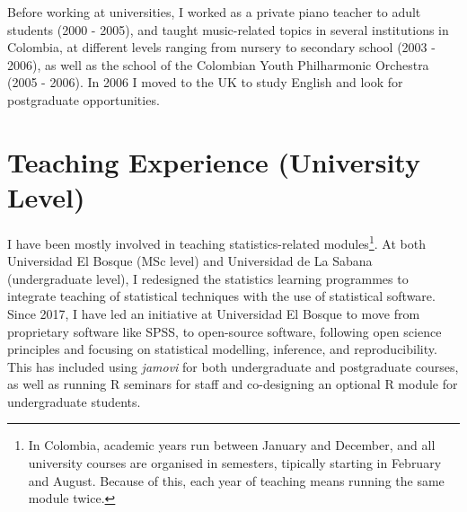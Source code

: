 \documentclass[11pt, a4paper]{awesome-cv}
\begin{document}
\begin{cventries}
{\begin{cvitems}
\end{cvitems}}
\end{cventries}

Before working at universities, I worked as a private piano teacher to
adult students (2000 - 2005), and taught music-related topics in several
institutions in Colombia, at different levels ranging from nursery to
secondary school (2003 - 2006), as well as the school of the Colombian
Youth Philharmonic Orchestra (2005 - 2006). In 2006 I moved to the UK to
study English and look for postgraduate opportunities.

\hypertarget{teaching-experience-university-level}{%
\section{Teaching Experience (University
Level)}\label{teaching-experience-university-level}}

I have been mostly involved in teaching statistics-related
modules\footnote{In Colombia, academic years run between January and
  December, and all university courses are organised in semesters,
  tipically starting in February and August. Because of this, each year
  of teaching means running the same module twice.}. At both Universidad
El Bosque (MSc level) and Universidad de La Sabana (undergraduate
level), I redesigned the statistics learning programmes to integrate
teaching of statistical techniques with the use of statistical software.
Since 2017, I have led an initiative at Universidad El Bosque to move
from proprietary software like SPSS, to open-source software, following
open science principles and focusing on statistical modelling,
inference, and reproducibility. This has included using \emph{jamovi}
for both undergraduate and postgraduate courses, as well as running R
seminars for staff and co-designing an optional R module for
undergraduate students.
\end{document}

